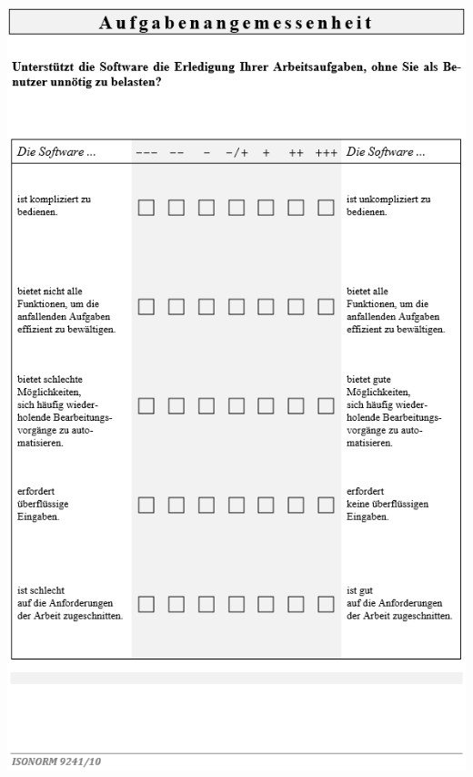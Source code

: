 \label{sec:ISOFragebogen}
\bigskip\noindent
\begin{minipage}{\textwidth}
  \centering
  \includegraphics{img/ISO9241-10Fragebogen_S1.PNG}
\end{minipage}


